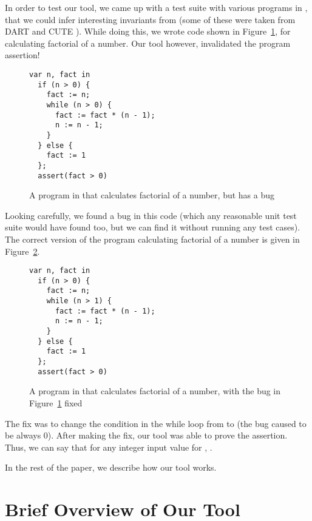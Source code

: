 In order to test our tool, we came up with a test suite with various programs in \lang, that we could infer interesting invariants from (some of these were taken from DART \cite{Godefroid2005} and CUTE \cite{Sen2005}).
While doing this, we wrote code shown in Figure~\ref{fig:fact-wrong}, for calculating factorial of a number.
Our tool however, invalidated the program assertion! 
\begin{figure}
\begin{verbatim}
var n, fact in
  if (n > 0) {
    fact := n;
    while (n > 0) {
      fact := fact * (n - 1);
      n := n - 1;
    }
  } else {
    fact := 1
  };  
  assert(fact > 0)   
\end{verbatim}
\caption{A program in \lang that calculates factorial of a number, but has a bug}
\label{fig:fact-wrong}
\end{figure}

Looking carefully, we found a bug in this code (which any reasonable unit test suite would have found too, but we can find it without running any test cases).
The correct version of the program calculating factorial of a number is given in Figure~\ref{fig:fact-correct}.
\begin{figure}
\begin{verbatim}
var n, fact in
  if (n > 0) {
    fact := n;
    while (n > 1) {
      fact := fact * (n - 1);
      n := n - 1;
    }
  } else {
    fact := 1
  };  
  assert(fact > 0)   
\end{verbatim}
\caption{A program in \lang that calculates factorial of a number, with the bug in Figure~\ref{fig:fact-wrong} fixed}
\label{fig:fact-correct}
\end{figure}
The fix was to change the condition in the while loop from  to  (the bug caused  to be always 0).
After making the fix, our tool was able to prove the assertion.
Thus, we can say that for any integer input value for , .

In the rest of the paper, we describe how our tool works.

\section{Brief Overview of Our Tool}


